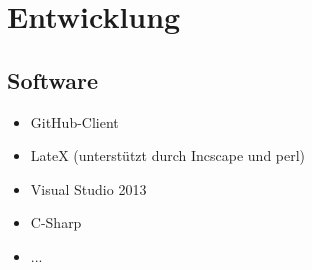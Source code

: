 \chapter{Entwicklung}

\section{Software}

\begin{itemize}


\item GitHub-Client
\item LateX (unterstützt durch Incscape und perl)
\item Visual Studio 2013
\item C-Sharp
\item ...

\end{itemize}